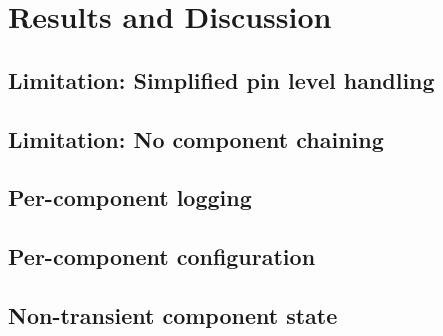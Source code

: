 
\chapter{Results and Discussion} \label{chapter:results}

\section{Limitation: Simplified pin level handling}


\section{Limitation: No component chaining}

\section{Per-component logging}
\section{Per-component configuration}


\section{Non-transient component state}



